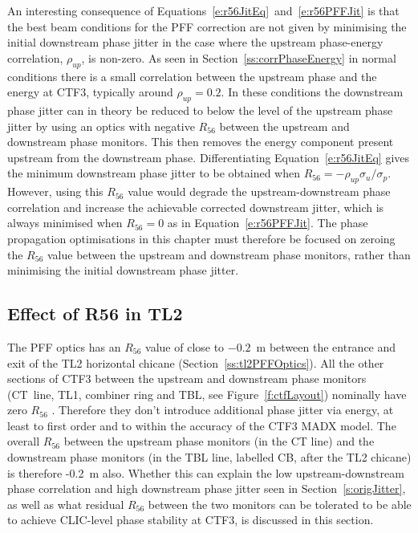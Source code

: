 An interesting consequence of Equations~\ref{e:r56JitEq}~and~\ref{e:r56PFFJit} is that the best beam conditions for the PFF correction are not given by minimising the initial downstream phase jitter in the case where the upstream phase-energy correlation, \(\rho_{up}\), is non-zero. As seen in Section~\ref{ss:corrPhaseEnergy} in normal conditions there is a small correlation between the upstream phase and the energy at CTF3, typically around \(\rho_{up}=0.2\). In these conditions the downstream phase jitter can in theory be reduced to below the level of the upstream phase jitter by using an optics with negative \(R_{56}\) between the upstream and downstream phase monitors. This then removes the energy component present upstream from the downstream phase. Differentiating Equation~\ref{e:r56JitEq} gives the minimum downstream phase jitter to be obtained when \(R_{56} = -\rho_{up}\sigma_u/\sigma_p\). However, using this \(R_{56}\) value would degrade the upstream-downstream phase correlation and increase the achievable corrected downstream jitter, which is always minimised when \(R_{56} = 0\) as in Equation~\ref{e:r56PFFJit}. The phase propagation optimisations in this chapter must therefore be focused on zeroing the \(R_{56}\) value between the upstream and downstream phase monitors, rather than minimising the initial downstream phase jitter. 

\subsection{Effect of R56 in TL2}
\label{ss:r56TL2Effect}

The PFF optics has an \(R_{56}\) value of close to \(-0.2\)~m between the entrance and exit of the TL2 horizontal chicane (Section~\ref{ss:tl2PFFOptics}).
All the other sections of CTF3 between the upstream and downstream phase monitors (CT~line, TL1, combiner ring and TBL, see Figure~\ref{f:ctfLayout}) nominally have zero \(R_{56}\) \cite{CTF3}. Therefore they don't introduce additional phase jitter via energy, at least to first order and to within the accuracy of the CTF3 MADX model. The overall \(R_{56}\) between the upstream phase monitors (in the CT line) and the downstream phase monitors (in the TBL line, labelled CB, after the TL2 chicane) is therefore -0.2~m also. Whether this can explain the low upstream-downstream phase correlation and high downstream phase jitter seen in Section~\ref{s:origJitter}, as well as what residual \(R_{56}\) between the two monitors can be tolerated to be able to achieve CLIC-level phase stability at CTF3, is discussed in this section.

